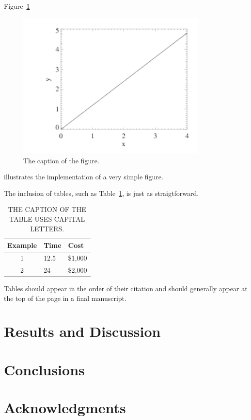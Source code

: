 \documentclass{article}
\newenvironment{ThesisPaperBibliography}{}{}
\newcommand{\ThesisPaperReferences}[1]{}
\begin{document}
Figure~\ref{fig:fig01} %
\begin{figure}[t]
  \begin{center}
  \includegraphics[width=3.75in]{simple.pdf}
  \end{center}
  \caption{The caption of the figure.}
\label{fig:fig01}
\end{figure}
illustrates the implementation of a very simple figure. \lipsum[61-65]

The inclusion of tables, such as Table~\ref{tbl:tbl01}, is just as
straigtforward. %
\begin{table}[t]
  \caption{THE CAPTION OF THE TABLE USES CAPITAL LETTERS.}
  \label{tbl:tbl01}
  \begin{center}
  \begin{tabular}{c l l}
  \hline
  Example & Time & Cost \\
  \hline
  1 & 12.5 & \$1,000 \\
  2 & 24 & \$2,000 \\
  \hline
  \end{tabular}
  \end{center}
\end{table}
Tables should appear in the order of their citation and should
generally appear at the top of the page in a final manuscript.
\lipsum[66-70]


\section{Results and Discussion} \label{sec:results}
\lipsum[71-80]


\section{Conclusions}
\lipsum[81-85]


\section*{Acknowledgments}
\lipsum[86]


\begin{ThesisPaperBibliography}{REFERENCES}

\ThesisPaperReferences{add}
\end{ThesisPaperBibliography}

\end{document}
